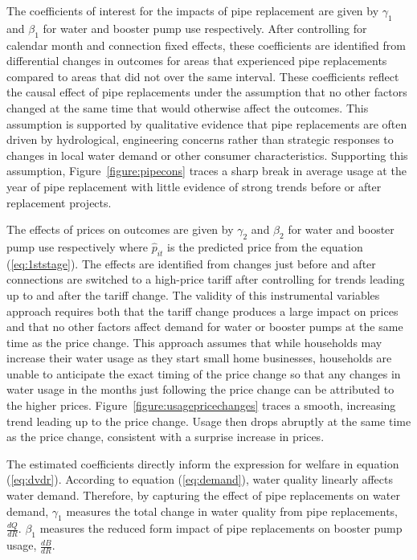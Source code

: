 \documentclass[12pt,table]{article}
\begin{document}
The coefficients of interest for the impacts of pipe replacement are given by $\gamma_1$ and $\beta_1$ for water and booster pump use respectively.  After controlling for calendar month and connection fixed effects, these coefficients are identified from differential changes in outcomes for areas that experienced pipe replacements compared to areas that did not over the same interval.  These coefficients reflect the causal effect of pipe replacements under the assumption that no other factors changed at the same time that would otherwise affect the outcomes.  This assumption is supported by qualitative evidence that pipe replacements are often driven by hydrological, engineering concerns rather than strategic responses to changes in local water demand or other consumer characteristics.  Supporting this assumption, Figure~\ref{figure:pipecons} traces a sharp break in average usage at the year of pipe replacement with little evidence of strong trends before or after replacement projects.

The effects of prices on outcomes are given by $\gamma_2$ and $\beta_2$ for water and booster pump use respectively where $\hat{p}_{it}$ is the predicted price from the equation (\ref{eq:1ststage}).  The effects are identified from changes just before and after connections are switched to a high-price tariff after controlling for trends leading up to and after the tariff change.  The validity of this instrumental variables approach requires both that the tariff change produces a large impact on prices and that no other factors affect demand for water or booster pumps at the same time as the price change.  This approach assumes that while households may increase their water usage as they start small home businesses, households are unable to anticipate the exact timing of the price change so that any changes in water usage in the months just following the price change can be attributed to the higher prices.  Figure~\ref{figure:usagepricechanges} traces a smooth, increasing trend leading up to the price change.  Usage then drops abruptly at the same time as the price change, consistent with a surprise increase in prices.

The estimated coefficients directly inform the expression for welfare in equation (\ref{eq:dvdr}).  According to equation (\ref{eq:demand}), water quality linearly affects water demand.  Therefore, by capturing the effect of pipe replacements on water demand, $\gamma_1$ measures the total change in water quality from pipe replacements, $\frac{dQ}{dR}$.  $\beta_1$ measures the reduced form impact of pipe replacements on booster pump usage, $\frac{dB}{dR}$.  
\end{document}
